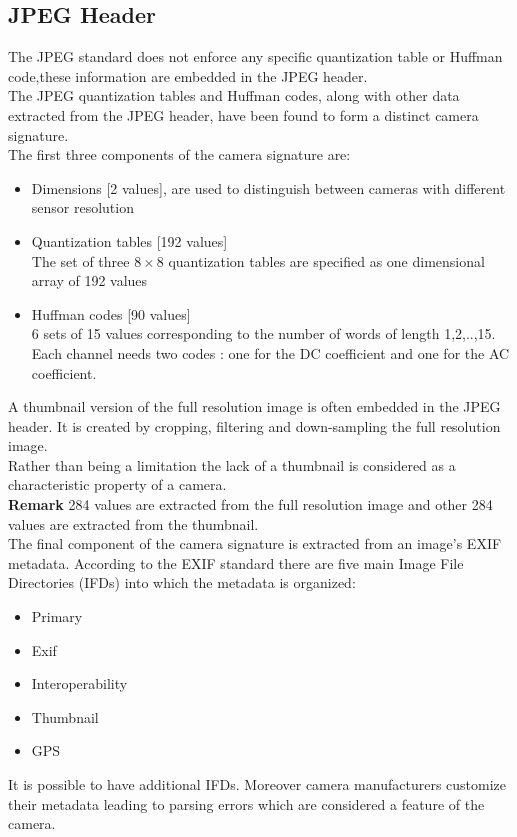 \documentclass[10pt,a4paper]{book}
\begin{document}
\subsection{JPEG Header}
The JPEG standard does not enforce any specific quantization table or Huffman code,these information are embedded in the JPEG header.\\
The JPEG quantization tables and Huffman codes, along with other data extracted from the JPEG header, have been found to form a distinct camera signature.\\
The first three components of the camera signature are:
\begin{itemize}
\item Dimensions [2 values], are used to distinguish between cameras with different sensor resolution
\item Quantization tables [192 values]\\
The set of three $8 \times 8$ quantization tables are specified as one dimensional array of 192 values
\item Huffman codes [90 values]\\
6 sets of 15 values corresponding to the number of words of length 1,2,..,15. Each channel needs two codes : one for the DC coefficient and one for the AC coefficient.\\
\end{itemize}
A thumbnail version of the full resolution image is often embedded in the JPEG header. It is created by cropping, filtering and down-sampling the full resolution image.\\
Rather than being a limitation the lack of a thumbnail is considered as a characteristic property of a camera.\\
\textbf{Remark} 284 values are extracted from the full resolution image and other 284 values are extracted from the thumbnail.\\
The final component of the camera signature is extracted from an image's EXIF metadata. According to the EXIF standard there are five main Image File Directories (IFDs) into which the metadata is organized:
\begin{itemize}
\item Primary 
\item Exif
\item Interoperability
\item Thumbnail
\item GPS
\end{itemize}
It is possible to have additional IFDs. Moreover camera manufacturers customize their metadata leading to parsing errors which are considered a feature of the camera.\\
\end{document}

